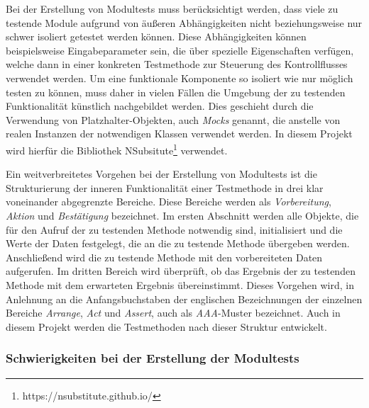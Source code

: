 Bei der Erstellung von Modultests muss berücksichtigt werden, dass viele zu testende Module aufgrund von äußeren Abhängigkeiten nicht beziehungsweise nur schwer isoliert getestet werden können. Diese Abhängigkeiten können beispielsweise Eingabeparameter sein, die über spezielle Eigenschaften verfügen, welche dann in einer konkreten Testmethode zur Steuerung des Kontrollflusses verwendet werden. Um eine funktionale Komponente so isoliert wie nur möglich testen zu können, muss daher in vielen Fällen die Umgebung der zu testenden Funktionalität künstlich nachgebildet werden. Dies geschieht durch die Verwendung von Platzhalter-Objekten, auch \textit{Mocks} genannt, die anstelle von realen Instanzen der notwendigen Klassen verwendet werden. In diesem Projekt wird hierfür die Bibliothek NSubsitute\footnote{https://nsubstitute.github.io/} verwendet. 

Ein weitverbreitetes Vorgehen bei der Erstellung von Modultests ist die Strukturierung der inneren Funktionalität einer Testmethode in drei klar voneinander abgegrenzte Bereiche. Diese Bereiche werden als \textit{Vorbereitung}, \textit{Aktion} und \textit{Bestätigung} bezeichnet. Im ersten Abschnitt werden alle Objekte, die für den Aufruf der zu testenden Methode notwendig sind, initialisiert und die Werte der Daten festgelegt, die an die zu testende Methode übergeben werden. Anschließend wird die zu testende Methode mit den vorbereiteten Daten aufgerufen. Im dritten Bereich wird überprüft, ob das Ergebnis der zu testenden Methode mit dem erwarteten Ergebnis übereinstimmt. Dieses Vorgehen wird, in Anlehnung an die Anfangsbuchstaben der englischen Bezeichnungen der einzelnen Bereiche \textit{Arrange}, \textit{Act} und \textit{Assert}, auch als \textit{AAA}-Muster bezeichnet. Auch in diesem Projekt werden die Testmethoden nach dieser Struktur entwickelt. 



\subsubsection{Schwierigkeiten bei der Erstellung der Modultests}

